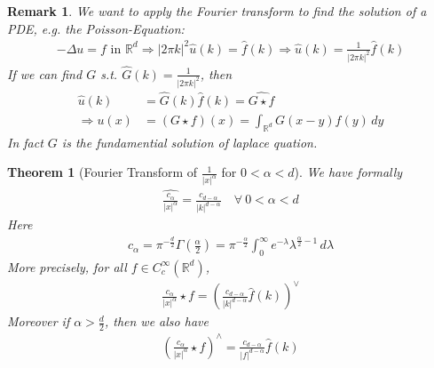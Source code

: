 \documentclass{report}
\theoremstyle{tommy}
\newtheorem{thm}[defn]{Theorem}
\newtheorem{rem}[defn]{Remark}
\newcommand{\Rd}{\mathbb{R}^d}
\begin{document}
  \begin{rem}
    We want to apply the Fourier transform to find the solution of a PDE, e.g. the Poisson-Equation:
    \begin{align*}
      - \Delta u = f \text{ in } \mathbb{R}^d
      \Rightarrow | 2 \pi k|^2 \hat u (k) = \hat f(k)
      \Rightarrow \hat u(k) = \frac{1}{|2 \pi k|^2} \hat f(k) 
    \end{align*}
    If we can find \(G\) s.t. \(\hat G(k)  = \frac{1}{|2 \pi k|^2}\), then
    \begin{align*}
      \hat u(k) &= \hat G(k) \hat f(k) = \widehat{G \star f} \\
      \Rightarrow u(x) &= (G \star f) (x) = \int_{\Rd} G(x-y)f(y)\, dy
    \end{align*}
    In fact \(G\) is the fundamential solution of laplace quation.
  \end{rem}

  
  \begin{thm}[Fourier Transform of \(\frac{1}{|x|^\alpha}\) for \(0 < \alpha < d\)] We have formally
    \begin{align*}
      \widehat{\frac{c_\alpha}{|x|^\alpha}} = \frac{c_{d-\alpha}}{|k|^{d - \alpha}} \quad \forall\ 0 < \alpha < d
    \end{align*}
    Here
    \begin{align*}
      c_\alpha = \pi^{- \frac{d}{2}} \Gamma \left(\frac{\alpha}{2} \right) = \pi^{- \frac{\alpha}{2}} \int_0^\infty e^{-\lambda} \lambda^{\frac{\alpha}{2}-1} \, d\lambda
    \end{align*}
    More precisely, for all \(f \in C_c^\infty(\mathbb{R}^d)\), 
    \begin{align*}
      \frac{c_\alpha}{|x|^\alpha}\star f = \left(\frac{c_{d-\alpha}}{|k|^{d - \alpha}} \hat f (k)\right)^\lor
    \end{align*}
    Moreover if \(\alpha > \frac{d}{2}\), then we also have
    \begin{align*}
      \left(\frac{c_\alpha}{|x|^\alpha} \star f\right)^\land = \frac{c_{d - \alpha}}{|f|^{d-\alpha}} \hat f (k)
    \end{align*}
  \end{thm}
\end{document}
